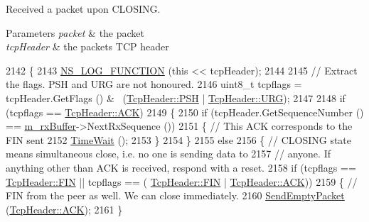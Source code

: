 Received a packet upon C\+L\+O\+S\+I\+NG. 


\begin{DoxyParams}{Parameters}
{\em packet} & the packet \\
\hline
{\em tcp\+Header} & the packet\textquotesingle{}s T\+CP header \\
\hline
\end{DoxyParams}

\begin{DoxyCode}
2142 \{
2143   \hyperlink{log-macros-disabled_8h_a90b90d5bad1f39cb1b64923ea94c0761}{NS\_LOG\_FUNCTION} (\textcolor{keyword}{this} << tcpHeader);
2144 
2145   \textcolor{comment}{// Extract the flags. PSH and URG are not honoured.}
2146   uint8\_t tcpflags = tcpHeader.GetFlags () & ~(\hyperlink{classns3_1_1TcpHeader_a5f3d432941327854b5ad621e467479c6a3f1e9f1fc7466d436279cfe7ab9ef3db}{TcpHeader::PSH} | 
      \hyperlink{classns3_1_1TcpHeader_a5f3d432941327854b5ad621e467479c6a03d58c80bf87169baf9f2f4896b7cf65}{TcpHeader::URG});
2147 
2148   \textcolor{keywordflow}{if} (tcpflags == \hyperlink{classns3_1_1TcpHeader_a5f3d432941327854b5ad621e467479c6a1182e63050402c9f49208c62c1ec2d5c}{TcpHeader::ACK})
2149     \{
2150       \textcolor{keywordflow}{if} (tcpHeader.GetSequenceNumber () == \hyperlink{classns3_1_1TcpSocketBase_a0163894148e5a70e6bd89970a1483fae}{m\_rxBuffer}->NextRxSequence ())
2151         \{ \textcolor{comment}{// This ACK corresponds to the FIN sent}
2152           \hyperlink{classns3_1_1TcpSocketBase_acd41dedaf25ea16d290aa5737e303099}{TimeWait} ();
2153         \}
2154     \}
2155   \textcolor{keywordflow}{else}
2156     \{ \textcolor{comment}{// CLOSING state means simultaneous close, i.e. no one is sending data to}
2157       \textcolor{comment}{// anyone. If anything other than ACK is received, respond with a reset.}
2158       \textcolor{keywordflow}{if} (tcpflags == \hyperlink{classns3_1_1TcpHeader_a5f3d432941327854b5ad621e467479c6ad523ac42b96f79a086261246e83b5244}{TcpHeader::FIN} || tcpflags == (
      \hyperlink{classns3_1_1TcpHeader_a5f3d432941327854b5ad621e467479c6ad523ac42b96f79a086261246e83b5244}{TcpHeader::FIN} | \hyperlink{classns3_1_1TcpHeader_a5f3d432941327854b5ad621e467479c6a1182e63050402c9f49208c62c1ec2d5c}{TcpHeader::ACK}))
2159         \{ \textcolor{comment}{// FIN from the peer as well. We can close immediately.}
2160           \hyperlink{classns3_1_1TcpSocketBase_aa858913c9a4480a14d293f1014905b3e}{SendEmptyPacket} (\hyperlink{classns3_1_1TcpHeader_a5f3d432941327854b5ad621e467479c6a1182e63050402c9f49208c62c1ec2d5c}{TcpHeader::ACK});
2161         \}

\end{DoxyCode}
